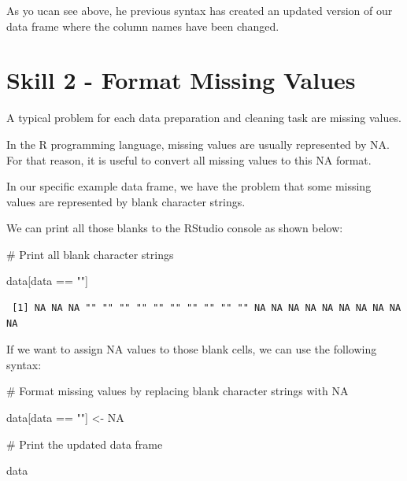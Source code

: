 \documentclass[
  letterpaper,
  DIV=11,
  numbers=noendperiod]{scrreprt}
\newenvironment{Shaded}{\begin{snugshade}}{\end{snugshade}}
\newcommand{\CommentTok}[1]{\textcolor[rgb]{0.37,0.37,0.37}{#1}}
\newcommand{\ConstantTok}[1]{\textcolor[rgb]{0.56,0.35,0.01}{#1}}
\newcommand{\NormalTok}[1]{\textcolor[rgb]{0.00,0.23,0.31}{#1}}
\newcommand{\OtherTok}[1]{\textcolor[rgb]{0.00,0.23,0.31}{#1}}
\newcommand{\SpecialCharTok}[1]{\textcolor[rgb]{0.37,0.37,0.37}{#1}}
\newcommand{\StringTok}[1]{\textcolor[rgb]{0.13,0.47,0.30}{#1}}
\begin{document}
As yo ucan see above, he previous syntax has created an updated version
of our data frame where the column names have been changed.

\section*{Skill 2 - Format Missing
Values}\label{skill-2---format-missing-values}


A typical problem for each data preparation and cleaning task are
missing values.

In the R programming language, missing values are usually represented by
NA. For that reason, it is useful to convert all missing values to this
NA format.

In our specific example data frame, we have the problem that some
missing values are represented by blank character strings.

We can print all those blanks to the RStudio console as shown below:

\begin{Shaded}
\begin{Highlighting}[]
\CommentTok{\# Print all blank character strings}

\NormalTok{data[data }\SpecialCharTok{==} \StringTok{""}\NormalTok{]}
\end{Highlighting}
\end{Shaded}

\begin{verbatim}
 [1] NA NA NA "" "" "" "" "" "" "" "" "" "" NA NA NA NA NA NA NA NA NA NA
\end{verbatim}

If we want to assign NA values to those blank cells, we can use the
following syntax:

\begin{Shaded}
\begin{Highlighting}[]
\CommentTok{\# Format missing values by replacing blank character strings with NA}

\NormalTok{data[data }\SpecialCharTok{==} \StringTok{""}\NormalTok{] }\OtherTok{\textless{}{-}} \ConstantTok{NA}

\CommentTok{\# Print the updated data frame}

\NormalTok{data}
\end{Highlighting}
\end{Shaded}
\end{document}

